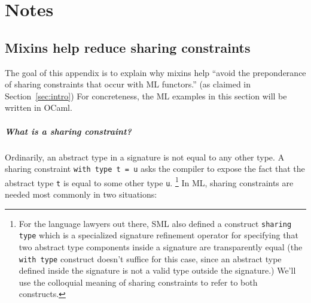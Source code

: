 \appendix

\chapter{Notes}

\section{Mixins help reduce sharing constraints}
\label{sec:mixins-reduce-sharing-constraints}

The goal of this appendix is to explain why mixins help ``avoid the
preponderance of sharing constraints that occur with ML functors.''
(as claimed in Section~\ref{sec:intro})  For concreteness, the ML
examples in this section will be written in OCaml.

\paragraph{What is a sharing constraint?}
Ordinarily, an abstract type in a signature is not equal to any other type.  A
sharing constraint \verb|with type t = u| asks the compiler to expose
the fact that the abstract type \verb|t| is equal to some other type \verb|u|.%
\footnote{For the language lawyers out there, SML also defined a
construct \texttt{sharing type} which is a specialized signature
refinement operator for specifying that two abstract type components
inside a signature are transparently equal (the \texttt{with type} construct
doesn't suffice for this case, since an abstract type defined inside
the signature is not a valid type outside the signature.) We'll use
the colloquial meaning of sharing constraints to refer to both constructs.}
In ML, sharing constraints are needed most commonly in two situations:

